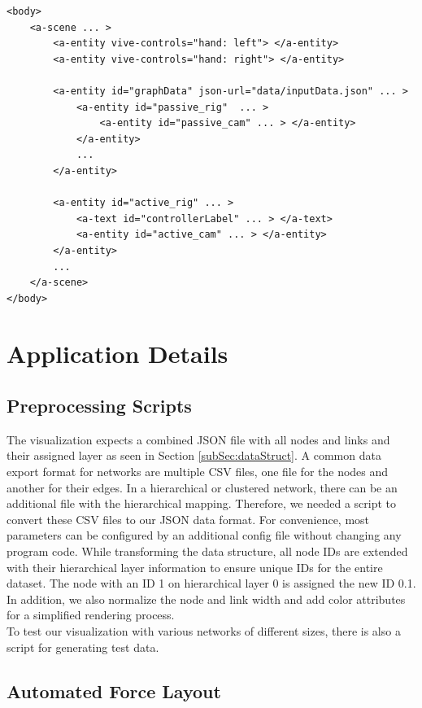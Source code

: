 \begin{lstlisting}[label={lst:virtualSceneGraph},caption=Simplified virtual A-Frame scene graph used by the application.]
<body>
    <a-scene ... >
        <a-entity vive-controls="hand: left"> </a-entity>
        <a-entity vive-controls="hand: right"> </a-entity>
        
        <a-entity id="graphData" json-url="data/inputData.json" ... >
            <a-entity id="passive_rig"  ... >  
                <a-entity id="passive_cam" ... > </a-entity>
            </a-entity>
            ...
        </a-entity>

        <a-entity id="active_rig" ... >
            <a-text id="controllerLabel" ... > </a-text>
            <a-entity id="active_cam" ... > </a-entity>
        </a-entity>
        ...
    </a-scene>
</body>
\end{lstlisting}

\section{Application Details}
\label{sec:applDetails}
\subsection{Preprocessing Scripts}
\label{sec:preprocessing}

The visualization expects a combined JSON file with all nodes and links and their assigned layer as seen in Section \ref{subSec:dataStruct}.
A common data export format for networks are multiple CSV files, one file for the nodes and another for their edges.
In a hierarchical or clustered network, there can be an additional file with the hierarchical mapping.
Therefore, we needed a script to convert these CSV files to our JSON data format. For convenience, most parameters can be configured by an additional config file without changing any program code. 
While transforming the data structure, all node IDs are extended with their hierarchical layer information to ensure unique IDs for the entire dataset. The node with an ID 1 on hierarchical layer 0 is assigned the new ID 0.1.  
In addition, we also normalize the node and link width and add color attributes for a simplified rendering process.\\
To test our visualization with various networks of different sizes, there is also a script for generating test data.

\subsection{Automated Force Layout}
\label{sec:layoutCalculation}

